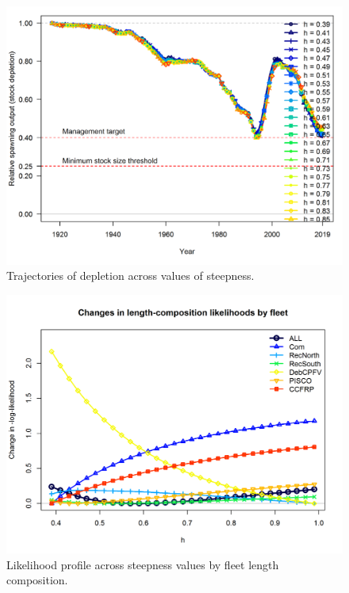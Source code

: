 \documentclass[12pt,]{article}
\begin{document}
\begin{figure}
\centering
\includegraphics{Figures/profile_h_depl.png}
\caption{Trajectories of depletion across values of steepness.
\label{fig:profile_h_depl}}
\end{figure}

\FloatBarrier

\begin{figure}
\centering
\includegraphics{Figures/profile_h_piner.png}
\caption{Likelihood profile across steepness values by fleet length
composition. \label{fig:profile_h_piner}}
\end{figure}

\FloatBarrier
\end{document}

